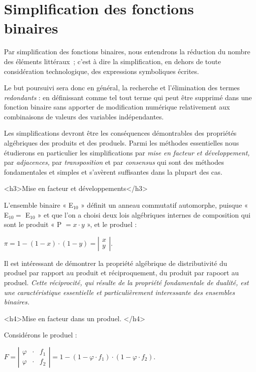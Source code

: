 \chapter{Simplification des fonctions binaires}

Par simplification des fonctions binaires, nous entendrons la réduction
du nombre des éléments littéraux~; c'est à dire la simplification,
en dehors de toute considération technologique, des expressions symboliques
écrites.

Le but poursuivi sera donc en général, la recherche et l'élimination
des termes \emph{redondants} : en définissant comme tel tout terme
qui peut être supprimé dans une fonction binaire sans apporter de
modification numérique relativement aux combinaisons de valeurs des
variables indépendantes.

Les simplifications devront être les conséquences démontrables des
propriétés algébriques des produits et des produels. Parmi les méthodes
essentielles nous étudierons en particulier les simplifications par
\emph{mise en facteur et développement, }par\emph{ adjacences, }par\emph{
transposition }et par\emph{ consensus} qui sont des méthodes fondamentales
et simples et s'avèrent suffisantes dans la plupart des cas.

<h3>Mise en facteur et développements</h3>

L'ensemble binaire «  E$_{10}$  »{} définit un anneau commutatif
automorphe, puisque «  E$_{10}=$ E$_{10}$  »{} et que l'on a
choisi deux lois algébriques internes de composition qui sont le produit
«  P $=x\cdot y$   »{}, et le produel : 



$\pi=1-\left(1-x\right)\cdot\left(1-y\right)=\left|\begin{array}{c}
x\\
y
\end{array}\right|$.



Il est intéressant de démontrer la propriété algébrique de distributivité
du produel par rapport au produit et réciproquement, du produit par
rapoort au produel. \textit{Cette réciprocité, qui résulte de la propriété
fondamentale de dualité, est une caractéristique essentielle et particulièrement
interessante des ensembles binaires.}

<h4>Mise en facteur dans un produel. </h4>

Considérons le produel :



$ F =\left|\begin{array}{ccc}
\varphi & \cdot & f_{1}\\
\varphi & \cdot & f_{2}
\end{array}\right|=1-\left(1-\varphi\cdot f_{1}\right)\cdot\left(1-\varphi\cdot f_{2}\right)$.



